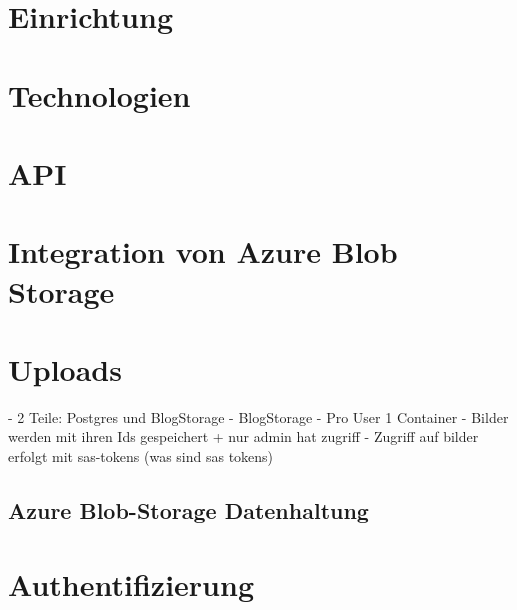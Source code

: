 
\section{Einrichtung}


\section{Technologien}


\section{API}


\section{Integration von Azure Blob Storage}

\section{Uploads}



\cite{MicrosoftCorporationv}
- 2 Teile: Postgres und BlogStorage
- BlogStorage
    - Pro User 1 Container
    - Bilder werden mit ihren Ids gespeichert + nur admin hat zugriff
    - Zugriff auf bilder erfolgt mit sas-tokens (was sind sas tokens)

\subsection{Azure Blob-Storage Datenhaltung}
\label{subsection:azure_blob_storage_datamodel}

\section{Authentifizierung}
